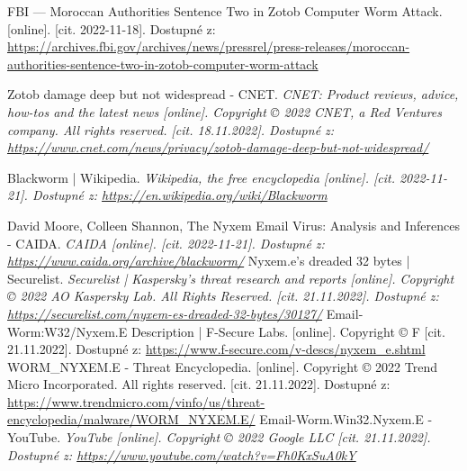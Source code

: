 \documentclass[a4paper,12pt]{article}
\begin{document}
{	
	{
		FBI — Moroccan Authorities Sentence Two in Zotob Computer Worm Attack. 
		[online]. [cit. 2022-11-18].
		Dostupné z: \url{https://archives.fbi.gov/archives/news/pressrel/press-releases/moroccan-authorities-sentence-two-in-zotob-computer-worm-attack}
	}
	
	{
		Zotob damage deep but not widespread - CNET. 
		\it{CNET: Product reviews, advice, how-tos and the latest news}
		[online]. Copyright © 2022 CNET, a Red Ventures company. All rights reserved. [cit. 18.11.2022].
		Dostupné z: \url{https://www.cnet.com/news/privacy/zotob-damage-deep-but-not-widespread/}
	}
	
	{
		Blackworm | Wikipedia.
		\it{Wikipedia, the free encyclopedia} [online]. [cit. 2022-11-21].
		Dostupné z: \url{https://en.wikipedia.org/wiki/Blackworm}
	}
	
	{
		David Moore, Colleen Shannon,
		The Nyxem Email Virus: Analysis and Inferences - CAIDA.
		\it{CAIDA} [online]. [cit. 2022-11-21].
		Dostupné z: \url{https://www.caida.org/archive/blackworm/}
	}
	{
		Nyxem.e’s dreaded 32 bytes | Securelist.
		\it{Securelist | Kaspersky’s threat research and reports} [online].
		Copyright © 2022 AO Kaspersky Lab. All Rights Reserved. [cit. 21.11.2022].
		Dostupné z: \url{https://securelist.com/nyxem-es-dreaded-32-bytes/30127/}
	}
	{
		Email-Worm:W32/Nyxem.E Description | F-Secure Labs.
		[online]. Copyright © F [cit. 21.11.2022].
		Dostupné z: \url{https://www.f-secure.com/v-descs/nyxem_e.shtml}
	}
	{
		WORM\_NYXEM.E - Threat Encyclopedia.
		[online]. Copyright © 2022 Trend Micro Incorporated. All rights reserved.
		[cit. 21.11.2022].
		Dostupné z: \url{https://www.trendmicro.com/vinfo/us/threat-encyclopedia/malware/WORM_NYXEM.E/}
	}
	{
		Email-Worm.Win32.Nyxem.E - YouTube.
		\it{YouTube} [online]. Copyright © 2022 Google LLC [cit. 21.11.2022].
		Dostupné z: \url{https://www.youtube.com/watch?v=Fh0KxSuA0kY}
	}
	
}
\end{document}
